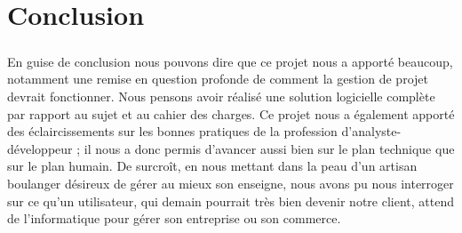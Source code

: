 \chapter*{Conclusion}
\paragraph{}
    En guise de conclusion nous pouvons dire que ce projet nous a apporté
    beaucoup, notamment une remise en question profonde de comment la gestion
    de projet devrait fonctionner. Nous pensons avoir réalisé une solution
    logicielle complète par rapport au sujet et au cahier des charges.
    Ce projet nous a également apporté des éclaircissements sur les bonnes
    pratiques de la profession d'analyste-développeur ; il nous a donc permis
    d'avancer aussi bien sur le plan technique que sur le plan humain.
    De surcroît, en nous mettant dans la peau d'un artisan boulanger désireux
    de gérer au mieux son enseigne, nous avons pu nous interroger sur ce qu'un
    utilisateur, qui demain pourrait très bien devenir notre client, attend de
    l'informatique pour gérer son entreprise ou son commerce.